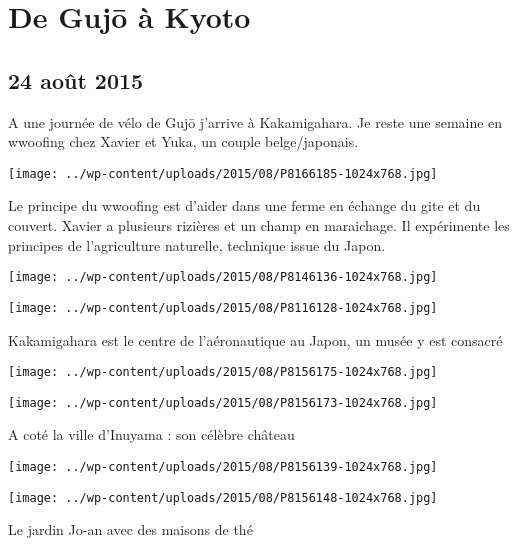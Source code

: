 \chapter{De Gujō à Kyoto}
\section*{24 août 2015}
A une journée de vélo de Gujō j'arrive à Kakamigahara. Je reste une semaine en wwoofing chez Xavier et Yuka, un couple belge/japonais. \newline
 \newline
\centerline{\texttt{[image: ../wp-content/uploads/2015/08/P8166185-1024x768.jpg]} } 
 \newline
 Le principe du wwoofing est d'aider dans une ferme en échange du gite et du couvert. \newline
 Xavier a plusieurs rizières et un champ en maraichage. Il expérimente les principes de l'agriculture naturelle, technique issue du Japon. \newline
 \newline
\centerline{\texttt{[image: ../wp-content/uploads/2015/08/P8146136-1024x768.jpg]} } 
 \newline
 \newline
\centerline{\texttt{[image: ../wp-content/uploads/2015/08/P8116128-1024x768.jpg]} } 
 \newline
 Kakamigahara est le centre de l'aéronautique au Japon, un musée y est consacré \newline
 \newline
\centerline{\texttt{[image: ../wp-content/uploads/2015/08/P8156175-1024x768.jpg]} } 
 \newline
 \newline
\centerline{\texttt{[image: ../wp-content/uploads/2015/08/P8156173-1024x768.jpg]} } 
 \newline
 A coté la ville d'Inuyama : son célèbre château \newline
 \newline
\centerline{\texttt{[image: ../wp-content/uploads/2015/08/P8156139-1024x768.jpg]} } 
 \newline
 \newline
\centerline{\texttt{[image: ../wp-content/uploads/2015/08/P8156148-1024x768.jpg]} } 
 \newline
 Le jardin Jo-an avec des maisons de thé \newline
